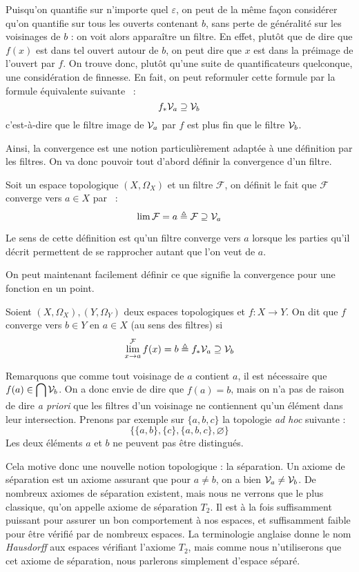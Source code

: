 Puisqu'on quantifie sur n'importe quel $\varepsilon$, on peut de la même façon
considérer qu'on quantifie sur tous les ouverts contenant $b$, sans perte de
généralité sur les voisinages de $b$ : on voit alors apparaître un filtre.
En effet, plutôt que de dire que $f(x)$ est dans tel ouvert autour de $b$,
on peut dire que $x$ est dans la préimage de l'ouvert par $f$. On trouve donc,
plutôt qu'une suite de quantificateurs quelconque, une considération de
finnesse. En fait, on peut reformuler cette formule par la formule équivalente
suivante~ :
\[f_*\mathcal{V}_a \supseteq \mathcal{V}_b\]
c'est-à-dire que le filtre image de $\mathcal{V}_a$ par $f$ est plus fin que le filtre
$\mathcal{V}_b$.

Ainsi, la convergence est une notion particulièrement adaptée à une définition
par les filtres. On va donc pouvoir tout d'abord définir la convergence d'un
filtre.

\begin{definition}
  Soit un espace topologique $(X,\Omega_X)$ et un filtre $\mathcal F$, on
  définit le fait que $\mathcal F$ converge vers $a\in X$ par~ :
  \[\lim \mathcal F = a \triangleq \mathcal F \supseteq \mathcal{V}_a\]
\end{definition}

Le sens de cette définition est qu'un filtre converge vers $a$ lorsque les
parties qu'il décrit permettent de se rapprocher autant que l'on veut de
$a$.

On peut maintenant facilement définir ce que signifie la convergence pour une
fonction en un point.

\begin{definition}
  Soient $(X,\Omega_X),(Y,\Omega_Y)$ deux espaces topologiques et $f : X \to Y$.
  On dit que $f$ converge vers $b\in Y$ en $a\in X$ (au sens des filtres) si
  \[\lim^{\mathcal F}_{x\to a}f(x) = b\triangleq f_*\mathcal{V}_a \supseteq\mathcal{V}_b\]
\end{definition}

Remarquons que comme tout voisinage de $a$ contient $a$, il est nécessaire que
$\displaystyle f(a)\in\bigcap\mathcal{V}_b$. On a donc envie de dire que $f(a)=b$,
mais on n'a pas de raison de dire \textit{a priori} que les filtres d'un
voisinage ne contiennent qu'un élément dans leur intersection. Prenons par
exemple sur $\{a,b,c\}$ la topologie \textit{ad hoc} suivante :
\[\{\{a,b\},\{c\},\{a,b,c\},\varnothing\}\]
Les deux éléments $a$ et $b$ ne peuvent pas être distingués.

Cela motive donc une nouvelle notion topologique : la séparation. Un axiome de
séparation est un axiome assurant que pour $a\neq b$, on a bien
$\mathcal{V}_a\neq\mathcal{V}_b$. De nombreux axiomes de séparation existent, mais nous ne
verrons que le plus classique, qu'on appelle axiome de séparation $T_2$. Il est
à la fois suffisamment puissant pour assurer un bon comportement à nos espaces,
et suffisamment faible pour être vérifié par de nombreux espaces. La
terminologie anglaise donne le nom \textit{Hausdorff} aux espaces vérifiant
l'axiome $T_2$, mais comme nous n'utiliserons que cet axiome de séparation, nous
parlerons simplement d'espace séparé.

